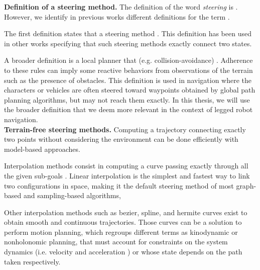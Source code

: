 \noindent\textbf{Definition of a steering method.}
The definition of the word \textit{steering} is .
However, we identify in previous works different definitions for the term .

The first definition states that a steering method  \cite{randomized_kino_planning_lavalle_2001}. 
This definition has been used in other works \cite{DIMT, move3d_lamiraux_2001} specifying that such steering methods exactly connect two states.

A broader definition is a local planner that  (e.g. collision-avoidance) \cite{van_toll_crowd_sim_2012}. 
Adherence to these rules can imply some reactive behaviors from observations of the terrain such as the presence of obstacles. %
This definition is used in navigation \cite{ondrej_pettre_steering_vision_2010,prm_rl_2019} where the characters or vehicles are often steered toward waypoints obtained by global path planning algorithms, but may not reach them exactly. 
In this thesis, we will use the broader definition that we deem more relevant in the context of legged robot navigation.\\


\noindent\textbf{Terrain-free steering methods.}
Computing a trajectory connecting exactly two points without considering the environment can be done efficiently with model-based approaches.

Interpolation methods consist in computing a curve passing exactly through all the given sub-goals \cite{interpolation_methods_bourke_1999}. Linear interpolation is the simplest and fastest way to link two configurations in space, making it the default steering method of most graph-based and sampling-based algorithms, %

Other interpolation methods such as bezier, spline, and hermite curves exist to obtain smooth and continuous trajectories.
Those curves can be a solution to perform motion planning, which regroups different terms as kinodynamic \cite{randomized_kino_planning_lavalle_2001, DIMT} or nonholonomic planning, that must account for constraints on the system dynamics (i.e. velocity and acceleration ) or whose state depends on the path taken respectively.

